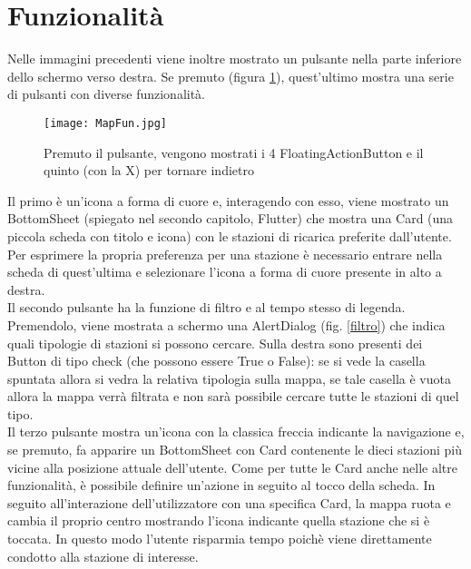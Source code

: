 \section{Funzionalità}
Nelle immagini precedenti viene inoltre mostrato un pulsante nella parte inferiore
dello schermo verso destra. Se premuto (figura \ref{4puls}), quest'ultimo mostra una serie di
pulsanti con diverse funzionalità.
\begin{figure}[!h]
    \centering
    \texttt{[image: MapFun.jpg]}
    \caption{Premuto il pulsante, vengono mostrati i 4 FloatingActionButton e il quinto (con la X) per tornare indietro}
    \label{4puls}
\end{figure}
Il primo è un'icona a forma di cuore e,
interagendo con esso, viene mostrato un BottomSheet (spiegato nel secondo
capitolo, Flutter) che mostra una Card (una piccola scheda con titolo e icona)
con le stazioni di ricarica preferite dall'utente. Per esprimere la propria
preferenza per una stazione è necessario entrare nella scheda di quest'ultima e
selezionare l'icona a forma di cuore presente in alto a destra. \\
Il secondo pulsante ha la funzione di filtro e al tempo stesso di legenda.
Premendolo, viene mostrata a schermo una AlertDialog (fig. \ref{filtro}) che indica quali
tipologie di stazioni si possono cercare. Sulla destra sono presenti dei Button
di tipo check (che possono essere True o False): se si vede la casella spuntata
allora si vedra la relativa tipologia sulla mappa, se tale casella è vuota
allora la mappa verrà filtrata e non sarà possibile cercare tutte le stazioni di
quel tipo. \\
Il terzo pulsante mostra un'icona con la classica freccia indicante la
navigazione e, se premuto, fa apparire un BottomSheet con Card contenente le
dieci stazioni più vicine alla posizione attuale dell'utente. Come per tutte le
Card anche nelle altre funzionalità, è possibile definire un'azione in seguito
al tocco della scheda. In seguito all'interazione dell'utilizzatore con una
specifica Card, la mappa ruota e cambia il proprio centro mostrando l'icona
indicante quella stazione che si è toccata. In questo modo l'utente risparmia
tempo poichè viene direttamente condotto alla stazione di interesse.
